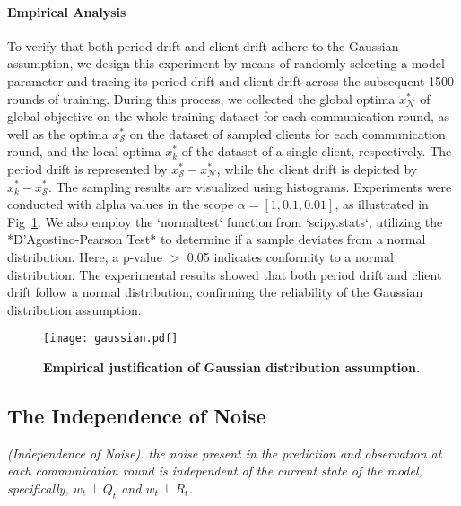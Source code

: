 \paragraph{Empirical Analysis}
To verify that both period drift and client drift adhere to the Gaussian assumption, we design this experiment by means of randomly selecting a model parameter and tracing its period drift and client drift across the subsequent 1500 rounds of training. 
During this process, we collected the global optima $x _ {\mathcal{N}}^*$ of global objective on the whole training dataset for each communication round, as well as the optima $x _ {\mathcal{S}}^*$ on the dataset of sampled clients for each communication round, and the local optima $x _ k^*$ of the dataset of a single client, respectively. 
The period drift is represented by $x _ {\mathcal{S}}^*-x _ {\mathcal{N}}^*$, while the client drift is depicted by $x _ {k}^*-x _ {\mathcal{S}}^*$. The sampling results are visualized using histograms. 
Experiments were conducted with alpha values in the scope $\alpha=[1,0.1,0.01]$, as illustrated in Fig~\ref{fig:gaussian}. We also employ the `normaltest` function from `scipy.stats`, utilizing the *D'Agostino-Pearson Test* to determine if a sample deviates from a normal distribution. Here, a p-value $>$ 0.05 indicates conformity to a normal distribution. 
The experimental results showed that both period drift and client drift follow a normal distribution, confirming the reliability of the Gaussian distribution assumption.


\begin{figure}[h]
    \centering
    \texttt{[image: gaussian.pdf]}
    \caption{\textbf{Empirical justification of Gaussian distribution assumption.}}
    \label{fig:gaussian}
\end{figure}



\subsection{The Independence of Noise}\label{appdx:noise}
\begin{lemma}[\ref{lemma:independence_noise}]
   \textit{(Independence of Noise). the noise present in the prediction and observation at each communication round is independent of the current state of the model, specifically, $w_t \perp Q_t$ and $w_t \perp R_t$.}
\end{lemma}

